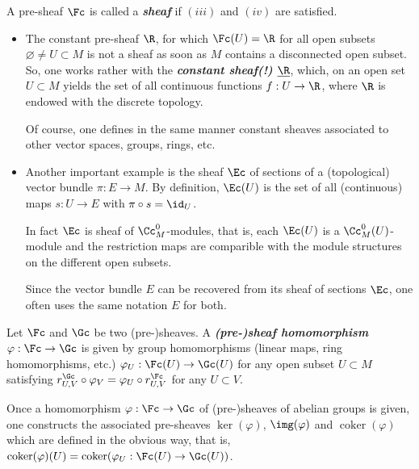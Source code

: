 \begin{defn}
	A pre-sheaf $\Fc$ is called a \textbf{\textit{sheaf}} if $(iii)$ and $(iv)$ are satisfied.
\end{defn}
\begin{example}\leavevmode
	\begin{itemize}
		\item The constant pre-sheaf $\R$, for which $\Fc(U)=\R$ for all open subsets $\varnothing\neq U\subset M$ is not a sheaf as soon as $M$ contains a disconnected open subset. So, one works rather with the \textbf{\textit{constant sheaf(!) $\underline{\R}$}}, which, on an open set $U\subset M$ yields the set of all continuous functions $f:U\to\R$, where $\R$ is endowed with the discrete topology.
	
		Of course, one defines in the same manner constant sheaves associated to other vector spaces, groups, rings, etc.
		\item Another important example is the sheaf $\Ec$ of sections of a (topological) vector bundle $\pi:E\to M$. By definition, $\Ec(U)$ is the set of all (continuous) maps $s:U\to E$ with $\pi\circ s=\id_U$.
		
		In fact $\Ec$ is sheaf of $\Cc_M^0$-modules, that is, each $\Ec(U)$ is a $\Cc_M^0(U)$-module and the restriction maps are comparible with the module structures on the different open subsets.
		
		Since the vector bundle $E$ can be recovered from its sheaf of sections $\Ec$, one often uses the same notation $E$ for both.
	\end{itemize}
\end{example}

\begin{defn}
	Let $\Fc$ and $\Gc$ be two (pre-)sheaves. A \textbf{\textit{(pre-)sheaf homomorphism}} $\varphi:\Fc\to\Gc$ is given by group homomorphisms (linear maps, ring homomorphisms, etc.) $\varphi_U:\Fc(U)\to\Gc(U)$ for any open subset $U\subset M$ satisfying $r_{U,V}^{\Gc}\circ \varphi_V=\varphi_U\circ r_{U,V}^{\Fc}$ for any $U\subset V$.
\end{defn}
Once a homomorphism $\varphi:\Fc\to \Gc$ of (pre-)sheaves of abelian groups is given, one constructs the associated pre-sheaves $\ker(\varphi)$, $\img(\varphi)$ and $\operatorname{coker}(\varphi)$ which are defined in the obvious way, that is, $\operatorname{coker}(\varphi)(U)=\operatorname{coker}(\varphi_U:\Fc(U)\to\Gc(U))$.


